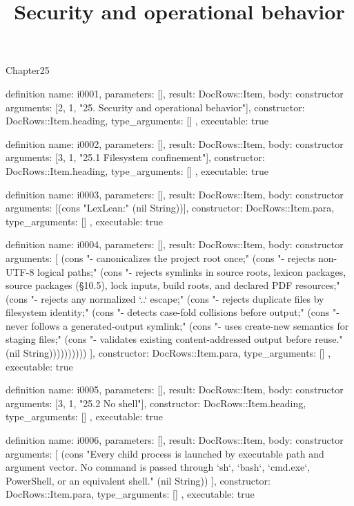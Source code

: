 \begin{lexlean}{Chapter25}
\title{Security and operational behavior}
\begin{semanticmodule}
definition{
  name: i0001,
  parameters: [],
  result: DocRows::Item,
  body: constructor{
    arguments: [2, 1, "25. Security and operational behavior"],
    constructor: DocRows::Item.heading,
    type_arguments: []
  },
  executable: true
}

definition{
  name: i0002,
  parameters: [],
  result: DocRows::Item,
  body: constructor{
    arguments: [3, 1, "25.1 Filesystem confinement"],
    constructor: DocRows::Item.heading,
    type_arguments: []
  },
  executable: true
}

definition{
  name: i0003,
  parameters: [],
  result: DocRows::Item,
  body: constructor{
    arguments: [(cons "LexLean:" (nil String))],
    constructor: DocRows::Item.para,
    type_arguments: []
  },
  executable: true
}

definition{
  name: i0004,
  parameters: [],
  result: DocRows::Item,
  body: constructor{
    arguments: [
      (cons "- canonicalizes the project root once;" (cons "- rejects non-UTF-8 logical paths;" (cons "- rejects symlinks in source roots, lexicon packages, source packages (§10.5), lock inputs, build roots, and declared PDF resources;" (cons "- rejects any normalized `..` escape;" (cons "- rejects duplicate files by filesystem identity;" (cons "- detects case-fold collisions before output;" (cons "- never follows a generated-output symlink;" (cons "- uses create-new semantics for staging files;" (cons "- validates existing content-addressed output before reuse." (nil String))))))))))
    ],
    constructor: DocRows::Item.para,
    type_arguments: []
  },
  executable: true
}

definition{
  name: i0005,
  parameters: [],
  result: DocRows::Item,
  body: constructor{
    arguments: [3, 1, "25.2 No shell"],
    constructor: DocRows::Item.heading,
    type_arguments: []
  },
  executable: true
}

definition{
  name: i0006,
  parameters: [],
  result: DocRows::Item,
  body: constructor{
    arguments: [
      (cons "Every child process is launched by executable path and argument vector. No command is passed through `sh`, `bash`, `cmd.exe`, PowerShell, or an equivalent shell." (nil String))
    ],
    constructor: DocRows::Item.para,
    type_arguments: []
  },
  executable: true
}


\end{semanticmodule}
\end{lexlean}
